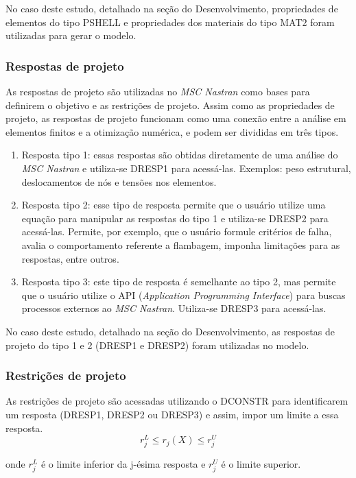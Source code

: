 No caso deste estudo, detalhado na seção do Desenvolvimento, propriedades de elementos do tipo PSHELL e propriedades dos materiais do tipo MAT2 foram utilizadas para gerar o modelo.

\subsubsection{Respostas de projeto}
As respostas de projeto são utilizadas no \emph{MSC Nastran} como bases para definirem o objetivo e as restrições de projeto. Assim como as propriedades de projeto, as respostas de projeto funcionam como uma conexão entre a análise em elementos finitos e a otimização numérica, e podem ser divididas em três tipos.

\begin{enumerate}
\item Resposta tipo 1: essas respostas são obtidas diretamente de uma análise do \emph{MSC Nastran} e utiliza-se DRESP1 para acessá-las. Exemplos: peso estrutural, deslocamentos de nós e tensões nos elementos.
\item Resposta tipo 2: esse tipo de resposta permite que o usuário utilize uma equação para manipular as respostas do tipo 1 e utiliza-se DRESP2 para acessá-las. Permite, por exemplo, que o usuário formule critérios de falha, avalia o comportamento referente a flambagem, imponha limitações para as respostas, entre outros.
\item Resposta tipo 3: este tipo de resposta é semelhante ao tipo 2, mas permite que o usuário utilize o API (\emph{Application Programming Interface}) para buscas processos externos ao \emph{MSC Nastran}. Utiliza-se DRESP3 para acessá-las.
\end{enumerate}

No caso deste estudo, detalhado na seção do Desenvolvimento, as respostas de projeto do tipo 1 e 2 (DRESP1 e DRESP2) foram utilizadas no modelo.

\subsubsection{Restrições de projeto}
As restrições de projeto são acessadas utilizando o DCONSTR para identificarem um resposta (DRESP1, DRESP2 ou DRESP3) e assim, impor um limite a essa resposta.
\begin{equation} \label{otimization_constraints}
r_{j}^L \leq r_{j}(X)\leq r_{j}^U
\end{equation}

onde $r_{j}^L$ é o limite inferior da j-ésima resposta e $r_{j}^U$ é o limite superior.

